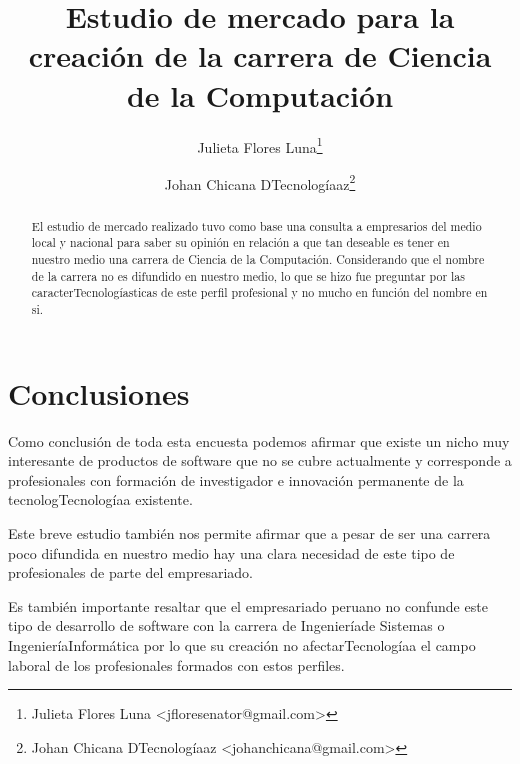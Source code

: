 \documentclass[a4paper,10pt]{article}
\title{Estudio de mercado para la creación de la carrera de Ciencia de la Computación}
\author{Julieta Flores Luna\footnote{Julieta Flores Luna <jfloresenator@gmail.com>}
\and Johan Chicana DTecnologíaaz\footnote{Johan Chicana DTecnologíaaz <johanchicana@gmail.com>}}
\begin{document}
\maketitle

\begin{abstract}
El estudio de mercado realizado tuvo como base una consulta a empresarios del medio local y nacional para saber su opinión en relación a que tan deseable es tener en nuestro medio una carrera de Ciencia de la Computación. Considerando que el nombre de la carrera no es difundido en nuestro medio, lo que se hizo fue preguntar por las caracterTecnologíasticas de este perfil profesional y no mucho en función del nombre en si.
\end{abstract}





\section{Conclusiones}
Como conclusión de toda esta encuesta podemos afirmar que existe un nicho muy interesante de productos de software que no se cubre actualmente y corresponde a profesionales con formación de investigador e innovación permanente de la tecnologTecnologíaa existente.

Este breve estudio también nos permite afirmar que a pesar de ser una carrera poco difundida en nuestro medio hay una clara necesidad de este tipo de profesionales de parte del empresariado.

Es también importante resaltar que el empresariado peruano no confunde este tipo de desarrollo de software con la carrera de Ingenieríade Sistemas o IngenieríaInformática por lo que su creación no afectarTecnologíaa el campo laboral de los profesionales formados con estos perfiles.
\end{document}
